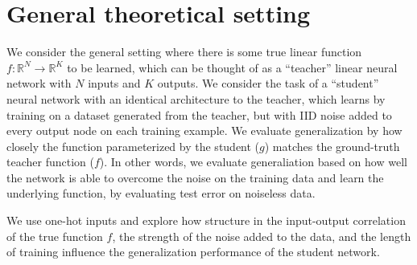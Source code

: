 \documentclass{article}
\newcommand{\R}{\mathbb{R}}
\begin{document}
\section{General theoretical setting}
We consider the general setting where there is some true linear function \(f: \R^N \rightarrow \R^K\) to be learned, which can be thought of as a ``teacher'' linear neural network with \(N\) inputs and \(K\) outputs. We consider the task of a ``student'' neural network with an identical architecture to the teacher, which learns by training on a dataset generated from the teacher, but with IID noise added to every output node on each training example. We evaluate generalization by how closely the function parameterized by the student (\(g\)) matches the ground-truth teacher function (\(f\)). In other words, we evaluate generaliation based on how well the network is able to overcome the noise on the training data and learn the underlying function, by evaluating test error on noiseless data. \par
We use one-hot inputs and explore how structure in the input-output correlation of the true function \(f\), the strength of the noise added to the data, and the length of training influence the generalization performance of the student network. 
\end{document}

